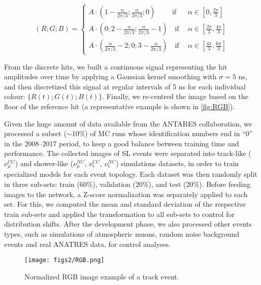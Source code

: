 \begin{equation}
	\label{eq:RGB}
	(R;G;B) = \left\{
	\begin{aligned}
		A\cdot(1-\tfrac{\alpha}{2\pi/3};\tfrac{\alpha}{2\pi/3};0) ~~~~~~
		\quad\text{if}~~&\alpha \in \left[0, \tfrac{2\pi}{3}\right]
		\\
		A\cdot(0;2-\tfrac{\alpha}{2\pi/3};\tfrac{\alpha}{2\pi/3}-1)
		\quad\text{if}~~&\alpha \in \left[\tfrac{2\pi}{3}, \tfrac{4\pi}{3}\right]
		\\
		A\cdot(\tfrac{\alpha}{2\pi/3}-2;0;3-\tfrac{\alpha}{2\pi/3})
		\quad\text{if}~~&\alpha \in \left[\tfrac{4\pi}{3}, \tfrac{6\pi}{3}\right]
	\end{aligned}
	\right.
\end{equation}

From the discrete hits, we built a continuous signal representing the hit amplitudes over time by applying a Gaussian kernel smoothing with $\sigma = 5$ ns, and then discretized this signal at regular intervals of 5 ns for each individual colour: $\{R(t);G(t);B(t)\}$. Finally, we re-centred the image based on the floor of the reference hit (a representative example is shown in \autoref{fig:RGB}).

Given the huge amount of data available from the ANTARES collaboration, we processed a subset ($\sim$10\%) of MC runs whose identification numbers end in ``0'' in the 2008--2017 period, to keep a good balance between training time and performance. The collected images of SL events were separated into track-like ($\nu_\mu^{CC}$) and shower-like ($\nu_\mu^{NC}$, $\nu_e^{CC}$, $\nu_e^{NC}$) simulations datasets, in order to train specialized models for each event topology. Each dataset was then randomly split in three sub-sets: train (60\%), validation (20\%), and test (20\%). Before feeding images to the network, a Z-score normalization was separately applied to each set. For this, we computed the mean and standard deviation of the respective train sub-sets and applied the transformation to all sub-sets to control for distribution shifts. After the development phase, we also processed other events types, such as simulations of atmospheric muons, random noise background events and real ANATRES data, for control analyses.

\begin{figure}[htbp]
	\centering
	\texttt{[image: figs2/RGB.png]}
	\caption{\label{fig:RGB}Normalized RGB image example of a track event.}
\end{figure}



